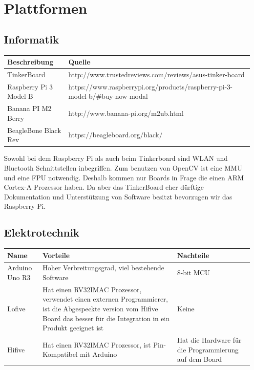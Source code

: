 \documentclass[a4paper]{report}
\begin{document}
\section{Plattformen}

\subsection{Informatik}
\vspace{1em}
\noindent
\begin{tabular}{|p{}|p{}|}
	\hline
	\textbf{Beschreibung} & \textbf{Quelle} \\
	\hline
	TinkerBoard & http://www.trustedreviews.com/reviews/asus-tinker-board \\
	\hline
	Raspberry Pi 3 Model B & https://www.raspberrypi.org/products/raspberry-pi-3-model-b/\#buy-now-modal \\
	\hline
	Banana PI M2 Berry & http://www.banana-pi.org/m2ub.html \\
	\hline
	BeagleBone Black Rev & https://beagleboard.org/black/\\
	\hline
\end{tabular}

\vspace{1em}
Sowohl bei dem Raspberry Pi als auch beim Tinkerboard sind WLAN und Bluetooth
Schnittstellen inbegriffen. Zum benutzen von OpenCV ist eine MMU und eine FPU
notwendig. Deshalb kommen nur Boards in Frage die einen ARM Cortex-A Prozessor
haben. Da aber das TinkerBoard eher dürftige Dokumentation und Unterstützung von Software besitzt \parencite[Fazit]{Finnamore2017} bevorzugen wir das Raspberry Pi.

\subsection{Elektrotechnik}
\vspace{1em}
\noindent
\begin{tabular}{|p{}|p{}|p{}|}
  \hline
  \textbf{Name} & \textbf{Vorteile} & \textbf{Nachteile} \\
  \hline
	Arduino Uno R3 & Hoher Verbreitungsgrad, viel bestehende Software & 8-bit MCU \\
	\hline
  Lofive & Hat einen RV32IMAC Prozessor, verwendet einen externen Programmierer, ist die Abgespeckte version vom Hifive Board das besser für die Integration in ein Produkt geeignet ist & Keine \\
  \hline
  Hifive & Hat einen RV32IMAC Prozessor, ist Pin-Kompatibel mit Arduino & Hat die Hardware für die Programmierung auf dem Board \\
  \hline
\end{tabular}
\end{document}
